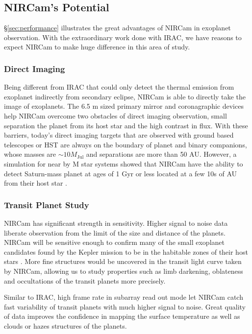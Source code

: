 \documentclass[preprint, 12pt]{aastex} \synctex=1
\begin{document}
\subsection{NIRCam's Potential} \S \ref{sec:performance} illustrates
the great advantages of NIRCam  in exoplanet observation. With the extraordinary
work done with IRAC, we have reasons to expect NIRCam to make huge
difference in this area of study.

\subsubsection{Direct Imaging} Being different from IRAC that could
only detect the thermal emission from exoplanet indirectly from
secondary eclipse, NIRCam is able to directly take the image of
exoplanets. The 6.5 m sized primary mirror and coronagraphic devices
help NIRCam overcome two obstacles of direct imaging observation,
small separation the planet from its host star and the high contrast
in flux. With these barriers, today's direct imaging targets that are
observed with ground based telescopes or HST are always on the
boundary of planet and binary companions, whose masses are
$\sim 10 M_{\mbox{Jul}}$ and separations are more than 50 AU. However,
a simulation for near by M star systems showed that NIRCam have the
ability to detect Saturn-mass planet at ages of 1 Gyr or less located
at a few 10s of AU from their host star \citep{2012SPIE.8442E..2NB}.

  \subsubsection{Transit Planet Study} NIRCam has significant strength in
sensitivity. Higher signal to noise data liberate
observation from the limit of the size and distance of the
planets. NIRCam will be sensitive enough to confirm many of the small
exoplanet candidates found by the Kepler mission to be in the habitable
zones of their host stars \citep{2012SPIE.8442E..2NB}. More fine
structures would be uncovered in the transit light curve taken by
NIRCam, allowing us to study properties such as limb darkening,
oblateness and occultations of the transit planets more precisely.

Similar to IRAC, high frame rate in subarray read out mode let NIRCam
catch fast variability of transit planets with much higher signal to
noise. Great quality of data improves the confidence in mapping the
surface temperature as well as clouds or hazes structures of the
planets.
\end{document}
